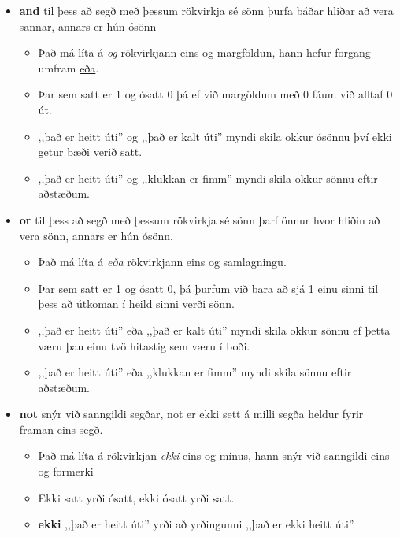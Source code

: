 \begin{itemize}
	\item[] \textbf{and} til þess að segð með þessum rökvirkja sé sönn þurfa báðar hliðar að vera sannar, annars er hún ósönn
	\begin{itemize}
		\item Það má líta á \textit{og} rökvirkjann eins og margföldun, hann hefur forgang umfram \underline{eða}.
		\item Þar sem satt er 1 og ósatt 0 þá ef við margöldum með 0 fáum við alltaf 0 út.
		\item ,,það er heitt úti'' og ,,það er kalt úti'' myndi skila okkur ósönnu því ekki getur bæði verið satt.
		\item ,,það er heitt úti'' og ,,klukkan er fimm'' myndi skila okkur sönnu eftir aðstæðum.
	\end{itemize}
	\item[] \textbf{or} til þess að segð með þessum rökvirkja sé sönn þarf önnur hvor hliðin að vera sönn, annars er hún ósönn.
	\begin{itemize}
		\item Það má líta á \textit{eða} rökvirkjann eins og samlagningu.
		\item Þar sem satt er 1 og ósatt 0, þá þurfum við bara að sjá 1 einu sinni til þess að útkoman í heild sinni verði sönn.
		\item ,,það er heitt úti'' eða ,,það er kalt úti'' myndi skila okkur sönnu ef þetta væru þau einu tvö hitastig sem væru í boði.
		\item ,,það er heitt úti'' eða ,,klukkan er fimm'' myndi skila sönnu eftir aðstæðum.
	\end{itemize}
	\item[] \textbf{not} snýr við sanngildi segðar, not er ekki sett á milli segða heldur fyrir framan eins segð.
	\begin{itemize}
		\item Það má líta á rökvirkjan \textit{ekki} eins og mínus, hann snýr við sanngildi eins og formerki
		\item Ekki satt yrði ósatt, ekki ósatt yrði satt.
		\item \textbf{ekki} ,,það er heitt úti'' yrði að yrðingunni ,,það er ekki heitt úti''.
	\end{itemize}
\end{itemize}

